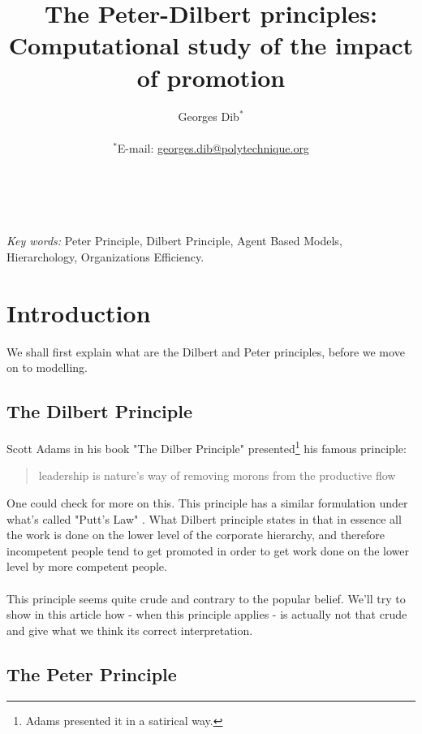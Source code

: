 \documentclass[11pt]{article}
\title{The Peter-Dilbert principles: Computational study of the impact of promotion}
\author{
Georges Dib$^{\ast}$\\
\\
\normalsize{$^\ast$E-mail: \href{mailto:georges.dib@polytechnique.org}{georges.dib@polytechnique.org}}
}
\begin{document}
\maketitle

\\
\\
\textit{Key words:} Peter Principle, Dilbert Principle, Agent Based Models, Hierarchology, Organizations Efficiency.

\section{Introduction}
We shall first explain what are the Dilbert and Peter principles, before we move on to modelling.

\subsection{The Dilbert Principle}
\label{dilbert}
Scott Adams in his book "The Dilber Principle" \cite{dilbert} presented\footnote{Adams presented it in a satirical way.} his famous principle:

\begin{quote}
leadership is nature's way of removing morons from the productive flow
\end{quote}

One could check \cite{dilbert} for more on this. This principle has a similar formulation under what's called "Putt's Law" \cite{putt}. What Dilbert principle states in that in essence all the work is done on the lower level of the corporate hierarchy, and therefore incompetent people tend to get promoted in order to get work done on the lower level by more competent people.\\
\\
This principle seems quite crude and contrary to the popular belief. We'll try to show in this article how - when this principle applies - is actually not that crude and give what we think its correct interpretation.

\subsection{The Peter Principle}
\label{peterprinciple}
\end{document}
